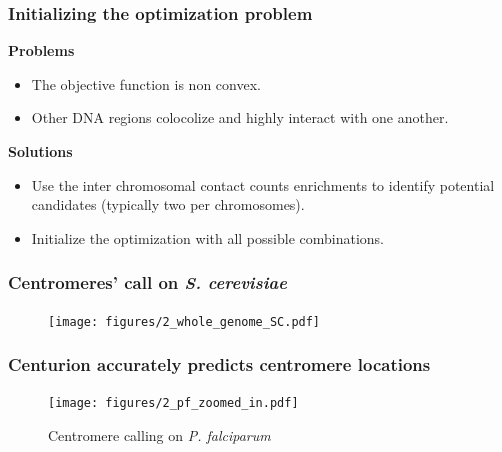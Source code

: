 \documentclass[xcolor=dvipsnames]{beamer}
\begin{document}
\begin{frame}
\frametitle{Initializing the optimization problem}

{\color{Blue} \bf Problems}
\begin{itemize}[label={$\bullet$}]
\item The objective function is non convex.
\item Other DNA regions colocolize and highly interact with one another.
\end{itemize}

\vspace{1em}
{\color{Blue} \bf Solutions}
\begin{itemize}[label={$\bullet$}]
\item Use the inter chromosomal contact counts enrichments to identify
potential candidates (typically two per chromosomes).
\item Initialize the optimization with all possible combinations.
\end{itemize}

\end{frame}

\begin{frame}
\frametitle{Centromeres' call on \textit{S. cerevisiae}}
\begin{figure}
\texttt{[image: figures/2\_whole\_genome\_SC.pdf]}
\end{figure}
\end{frame}


\begin{frame}
\frametitle{Centurion accurately predicts centromere locations}
\begin{figure}
\texttt{[image: figures/2\_pf\_zoomed\_in.pdf]}
\caption{Centromere calling on \textit{P. falciparum}}
\end{figure}
\end{frame}
\end{document}
